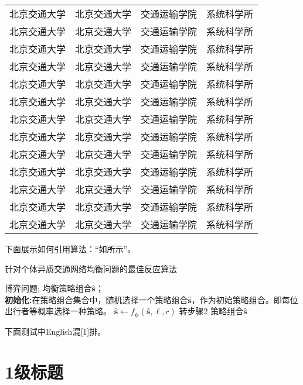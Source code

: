 {\begin{longtable}{@{\extracolsep{\fill}}cccc@{}}
北京交通大学&北京交通大学&交通运输学院&系统科学所\\
北京交通大学&北京交通大学&交通运输学院&系统科学所\\
北京交通大学&北京交通大学&交通运输学院&系统科学所\\
北京交通大学&北京交通大学&交通运输学院&系统科学所\\
北京交通大学&北京交通大学&交通运输学院&系统科学所\\
北京交通大学&北京交通大学&交通运输学院&系统科学所\\
北京交通大学&北京交通大学&交通运输学院&系统科学所\\
北京交通大学&北京交通大学&交通运输学院&系统科学所\\
北京交通大学&北京交通大学&交通运输学院&系统科学所\\
北京交通大学&北京交通大学&交通运输学院&系统科学所\\
北京交通大学&北京交通大学&交通运输学院&系统科学所\\
北京交通大学&北京交通大学&交通运输学院&系统科学所\\
北京交通大学&北京交通大学&交通运输学院&系统科学所\\
\end{longtable}
}

下面展示如何引用算法：“如所示”。

\begin{algorithm}[htbp] 
	\caption{针对个体异质交通网络均衡问题的最佳反应算法}
	\label{alg_ptn} 
	\begin{algorithmic}[1]
	 \Require
	 博弈问题; 
	 \Ensure 
	 均衡策略组合$\widehat{\bm{s}}$；\\
	 \textbf{初始化:}在策略组合集合中，随机选择一个策略组合$\widehat{\bm{s}}$，作为初始策略组合。即每位出行者等概率选择一种策略。
	 \State $\widehat{\bm{s}}\leftarrow{}f_{\bm{\phi}}\left(\widehat{\bm{s}},\ell,{r}\right)$
	 \State 转步骤2
	 \EndIf
	 \EndFor
	 \EndFor
	 \State \Return 策略组合$\widehat{\bm{s}}$
	\end{algorithmic} 
   \end{algorithm}

下面测试中English混\hspace{0em}[1]排。

\chapter{1级标题}
